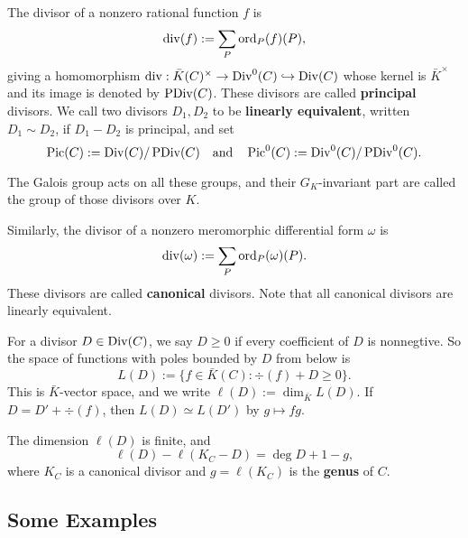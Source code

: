 The divisor of a nonzero rational function $f$ is\[\mathop{\mathrm{div}} (f) := \sum_P\operatorname{ord}_P(f) (P),\]
giving a homomorphism $\mathop{\mathrm{div}} : \bar K(C)^\times\to\operatorname{Div}^0(C)\hookrightarrow\operatorname{Div}(C)$ whose kernel is $\bar{K}^\times$ and its image is denoted by $\operatorname{PDiv}(C)$.
These divisors are called \textbf{principal} divisors.
We call two divisors $D_1, D_2$ to be \textbf{linearly equivalent}, written $D_1\sim D_2$, if $D_1-D_2$ is principal, and set \[\operatorname{Pic}(C) := \operatorname{Div}(C)/\operatorname{PDiv}(C)\quad\text{and}\quad \operatorname{Pic}^0(C) := \operatorname{Div}^0(C)/\operatorname{PDiv}^0(C).\]

The Galois group acts on all these groups, and their $G_K$-invariant part are called the group of those divisors over $K$.

Similarly, the divisor of a nonzero meromorphic differential form $\omega$ is \[\mathop{\mathrm{div}}(\omega) := \sum_P \operatorname{ord}_P(\omega)(P).\]
These divisors are called \textbf{canonical} divisors.
Note that all canonical divisors are linearly equivalent.



For a divisor $D\in\operatorname{Div}(C)$, we say $D\ge 0$ if every coefficient of $D$ is nonnegtive.
So the space of functions with poles bounded by $D$ from below is\[L(D) := \{f\in \bar{K}(C) : \div(f) + D \ge 0\}.\]
This is $\bar{K}$-vector space, and we write $\ell(D) := \dim_{\bar{K}} L(D)$. If $D =  D' + \div (f)$, then $L(D)\simeq L(D')$ by $g\mapsto fg$.
\begin{theorem}
    The dimension $\ell(D)$ is finite, and \[\ell(D) - \ell(K_C - D) = \deg D + 1 - g,\]
    where $K_C$ is a canonical divisor and $g = \ell(K_C)$ is the \textbf{genus} of $C$.
\end{theorem}

\subsection{Some Examples}

